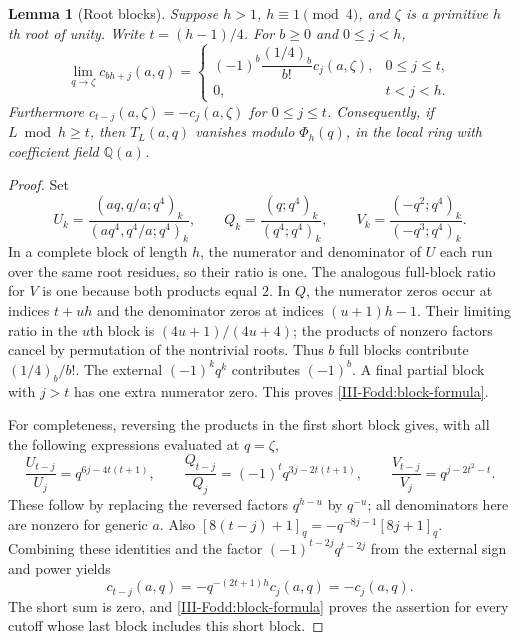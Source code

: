 \documentclass[11pt,letterpaper]{article}
\newtheorem{lemma}[theorem]{Lemma}
\numberwithin{equation}{section}
\begin{document}
\begin{lemma}[Root blocks]\label{III-Fodd:blocks}
Suppose $h>1$, $h\equiv1\pmod4$, and $\zeta$ is a primitive $h$th root
of unity. Write $t=(h-1)/4$. For $b\ge0$ and $0\le j<h$,
\begin{equation}\label{III-Fodd:block-formula}
 \lim_{q\to\zeta}c_{bh+j}(a,q)=
 \begin{cases}
 (-1)^b\dfrac{(1/4)_b}{b!}c_j(a,\zeta),&0\le j\le t,\\
 0,&t<j<h.
 \end{cases}
\end{equation}
Furthermore $c_{t-j}(a,\zeta)=-c_j(a,\zeta)$ for $0\le j\le t$.
Consequently, if $L\bmod h\ge t$, then $T_L(a,q)$ vanishes modulo
$\Phi_h(q)$, in the local ring with coefficient field $\mathbb Q(a)$.
\end{lemma}
\begin{proof}
Set
\[
 U_k=\frac{(aq,q/a;q^4)_k}{(aq^4,q^4/a;q^4)_k},\qquad
 Q_k=\frac{(q;q^4)_k}{(q^4;q^4)_k},\qquad
 V_k=\frac{(-q^2;q^4)_k}{(-q^3;q^4)_k}.
\]
In a complete block of length $h$, the numerator and denominator of
$U$ each run over the same root residues, so their ratio is one.
The analogous full-block ratio for $V$ is one because both products
equal $2$. In $Q$, the numerator zeros occur at indices $t+uh$ and
the denominator zeros at indices $(u+1)h-1$. Their limiting ratio in
the $u$th block is $(4u+1)/(4u+4)$; the products of nonzero factors
cancel by permutation of the nontrivial roots. Thus $b$ full blocks
contribute $(1/4)_b/b!$. The external $(-1)^kq^k$ contributes
$(-1)^b$. A final partial block with $j>t$ has one extra numerator
zero. This proves \eqref{III-Fodd:block-formula}.

For completeness, reversing the products in the first short block
gives, with all the following expressions evaluated at $q=\zeta$,
\[
 \frac{U_{t-j}}{U_j}=q^{6j-4t(t+1)},\qquad
 \frac{Q_{t-j}}{Q_j}=(-1)^tq^{3j-2t(t+1)},\qquad
 \frac{V_{t-j}}{V_j}=q^{j-2t^2-t}.
\]
These follow by replacing the reversed factors $q^{h-u}$ by $q^{-u}$;
all denominators here are nonzero for generic $a$.
Also
$[8(t-j)+1]_q=-q^{-8j-1}[8j+1]_q$.
Combining these identities and the factor $(-1)^{t-2j}q^{t-2j}$
from the external sign and power yields
\[
 c_{t-j}(a,q)=-q^{-(2t+1)h}c_j(a,q)=-c_j(a,q).
\]
The short sum is zero, and \eqref{III-Fodd:block-formula} proves the assertion
for every cutoff whose last block includes this short block.
\end{proof}
\end{document}

